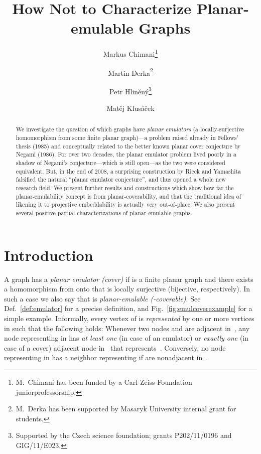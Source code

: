 \documentclass[envcountsect,envcountsame]{llncs}
\begin{document}
\title{How Not to Characterize Planar-emulable Graphs}
\author{Markus Chimani\thanks{M.~Chimani has been funded by a Carl-Zeiss-Foundation juniorprofessorship.}
	\and Martin Derka\thanks{M.~Derka has been supported by
	 Masaryk University internal grant for students.}
	\and Petr Hlin\v{e}n\'y\thanks{Supported by the Czech
	 science foundation; grants P202/11/0196 and GIG/11/E023.}
	\and Mat\v{e}j Klus\'a\v{c}ek}
\maketitle

\begin{abstract}
We investigate the question of which graphs have {\em planar emulators}
(a locally-surjective homomorphism from some finite planar graph)---a problem raised already in Fellows' thesis (1985) and conceptually related to
the better known planar cover conjecture by Negami (1986).
For over two decades, the planar emulator problem lived poorly in a shadow of
Negami's conjecture---which is still open---as the two were considered
equivalent.
But, in the end of 2008, a surprising construction by Rieck and Yamashita 
falsified the natural ``planar emulator conjecture'', 
and thus opened a whole new research field.
We present further results and constructions which show
how far the planar-emulability concept is from planar-coverability,
and that the traditional idea of likening it to projective embeddability
is actually very out-of-place.
We also present several positive partial characterizations
of planar-emulable graphs.
\end{abstract}







\section{Introduction}
\label{sec:intro}

A graph  has a {\em planar emulator (cover)}  if  is a
finite planar graph and there exists a homomorphism from  onto  that is locally
surjective (bijective, respectively).
In such a case we also say that  is {\em planar-emulable (-coverable)}.
See Def.~\ref{def:emulator} for a precise
definition, and Fig.~\ref{fig:emulcoverexample} for a simple example. 
Informally, every vertex of  is {\em represented} by one or more
vertices in  such that the following holds:
Whenever two nodes  and  are adjacent in~, any node representing  in 
has \emph{at least one} (in case of an emulator) or \emph{exactly one} (in case
of a cover) adjacent node in~ that represents~.
Conversely, no node representing  in  has a neighbor representing 
if  are nonadjacent in~.
\end{document}
